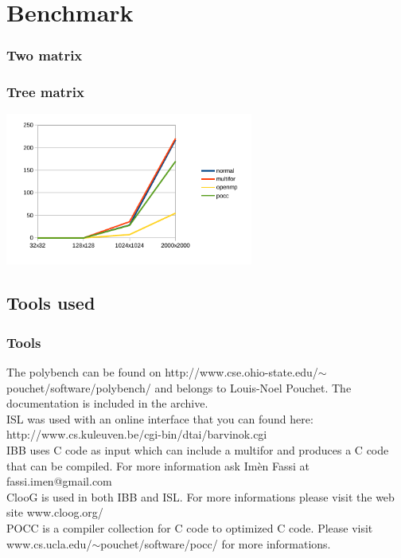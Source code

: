 \documentclass{beamer}
\begin{document}

\section{Benchmark}

\begin{frame}
\frametitle{Two matrix}
\centering

\end{frame}


\begin{frame}
\frametitle{Tree matrix}
\centering
\includegraphics[height=5cm]{pictures/3mmbench}
\end{frame}


\subsection{Tools used}

\begin{frame}
\frametitle{Tools}

The polybench can be found on http://www.cse.ohio-state.edu/$\sim$pouchet/software/polybench/ and belongs to Louis-Noel Pouchet. The documentation is included in the archive. \\
ISL was used with an online interface that you can found here: http://www.cs.kuleuven.be/cgi-bin/dtai/barvinok.cgi \\
IBB uses C code as input which can include a multifor and produces a C code that can be compiled. For more information ask Imèn Fassi at fassi.imen@gmail.com \\
ClooG is used in both IBB and ISL. For more informations please visit the web site www.cloog.org/ \\
POCC is a compiler collection for C code to optimized C code. Please visit www.cs.ucla.edu/$\sim$pouchet/software/pocc/ for more informations. \\

\end{frame}
\end{document}
